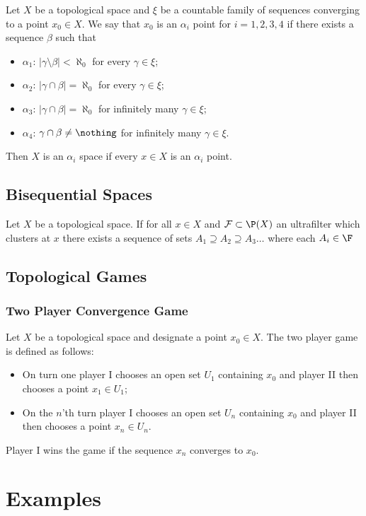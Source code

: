 \documentclass{article}
\begin{document}
\begin{defn}\cite{NY92}
    Let \(X\) be a topological space and \(\xi\) be a countable family of sequences converging to a point \(x_0 \in X\). We say that \(x_0\) is an \(\alpha_i\) point for \(i = 1, 2, 3, 4\) if there exists a sequence \(\beta\) such that 
    \begin{itemize}
        \item \(\alpha_1\):  \(|\gamma \setminus \beta| < \aleph_0\) for every \(\gamma \in \xi\);
        \item \(\alpha_2\): \(|\gamma \cap \beta| = \aleph_0\) for every \(\gamma \in \xi\);
        \item \(\alpha_3\): \(|\gamma \cap \beta| = \aleph_0\) for infinitely many \(\gamma \in \xi\);
        \item \(\alpha_4\): \(\gamma \cap \beta \neq \nothing\) for infinitely many \(\gamma \in \xi\).
    \end{itemize}
    Then \(X\) is an \(\alpha_i\) space if every \(x \in X\) is an \(\alpha_i\) point.
\end{defn}





\subsection{Bisequential Spaces}

\begin{defn}
    Let \(X\) be a topological space. If for all \(x \in X\) and \(\mathcal{F} \subset \P(X)\) an ultrafilter which clusters at \(x\) there exists a sequence of sets \(A_1 \supseteq A_2 \supseteq A_3 \dots\) where each \(A_i \in \F\)
\end{defn}





\subsection{Topological Games}
\subsubsection{Two Player Convergence Game \texorpdfstring{\cite{GH76}})}
    Let \(X\) be a topological space and designate a point \(x_0 \in X\). The two player game is defined as follows: 
    \begin{itemize}
            \item On turn one player I chooses an open set \(U_1\) containing \(x_0\) and player II then chooses a point \(x_1 \in U_1\);
            \item On the \(n\)'th turn player I chooses an open set \(U_n\) containing \(x_0\) and player II then chooses a point \(x_n \in U_n\).
    \end{itemize}  
    Player I wins the game if the sequence \(x_n\) converges to \(x_0\).





\section{Examples}




\newpage

{}
\end{document}
